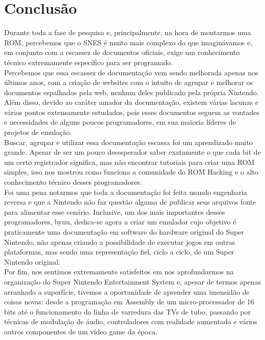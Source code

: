 \documentclass[paper=a4, fontsize=11pt]{scrartcl}	%
\numberwithin{equation}{section}															%
\numberwithin{figure}{section}																%
\numberwithin{table}{section}																%
\begin{document}
\section{Conclusão}

Durante toda a fase de pesquisa e, principalmente, na hora de montarmos uma ROM, percebemos que o SNES é muito mais complexo do que imaginávamos e, em conjunto com a escassez de documentos oficiais, exige um conhecimento técnico extremamente específico para ser programado.\\

Percebemos que essa escassez de documentação vem sendo melhorada apenas nos últimos anos, com a criação de websites com o intuito de agrupar e melhorar os documentos espalhados pela web, nenhum deles publicado pela própria Nintendo. Além disso, devido ao caráter amador da documentação, existem várias lacunas e vários pontos extensamente estudados, pois esses documentos seguem as vontades e necessidades de alguns poucos programadores, em sua maioria líderes de projetos de emulação.\\

Buscar, agrupar e utilizar essa documentação escassa foi um aprendizado muito grande. Apesar de ser um pouco desesperador saber exatamente o que cada bit de um certo registrador significa, mas não encontrar tutoriais para criar uma ROM simples, isso nos mostrou como funciona a comunidade do ROM Hacking e o alto conhecimento técnico desses programadores.\\

Foi uma pena notarmos que toda a documentação foi feita usando engenharia reversa e que a Nintendo não faz questão alguma de publicar seus arquivos fonte para alimentar esse cenário. Inclusive, um dos mais importantes desses programadores, byuu, dedica-se agora a criar um emulador cujo objetivo é praticamente uma documentação em software do hardware original do Super Nintendo, não apenas criando a possibilidade de executar jogos em outras plataformas, mas sendo uma representação fiel, ciclo a ciclo, de um Super Nintendo original.\cite{byuu}\\

Por fim, nos sentimos extremamente satisfeitos em nos aprofundarmos na organização do Super Nintendo Entertainment System e, apesar de termos apenas arranhado a superfície, tivemos a oportunidade de aprender uma imensidão de coisas novas: desde a programação em Assembly de um micro-processador de 16 bits até o funcionamento da linha de varredura das TVs de tubo, passando por técnicas de modulação de áudio, controladores com realidade aumentada e vários outros componentes de um vídeo game da época.
\end{document}
